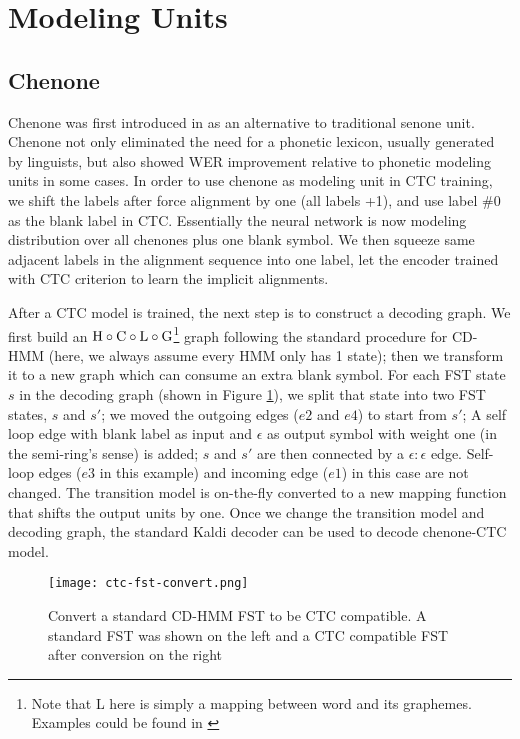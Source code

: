 \documentclass[a4paper]{article}
\begin{document}
\section{Modeling Units}

\subsection{Chenone}
\label{sec:chenone}

Chenone was first introduced in \cite{le2019senones} as an alternative to traditional senone \cite{dahl2011context} unit. Chenone not only eliminated the need for a phonetic lexicon, usually generated by linguists, but also showed WER improvement relative to phonetic modeling units in some cases. In order to use chenone as modeling unit in CTC training, we shift the labels after force alignment by one (all labels +1), and use label $\#0$ as the blank label in CTC. Essentially the neural network is now modeling distribution over all chenones plus one blank symbol. We then squeeze same adjacent labels in the alignment sequence into one label, let the encoder trained with CTC criterion to learn the implicit alignments. 

After a CTC model is trained, the next step is to construct a decoding graph. We first build an $\rm{H \circ C \circ L \circ G}$\footnote{Note that L here is simply a mapping between word and its graphemes. Examples could be found in \cite{le2019senones}}  graph following the standard procedure for CD-HMM (here, we always assume every HMM only has 1 state); then we transform it to a new graph which can consume an extra blank symbol. For each FST state $s$ in the decoding graph (shown in Figure \ref{fig:ctc_fst_convert}), we split that state into two FST states, $s$ and $s'$; we moved the outgoing edges ($e2$ and $e4$) to start from $s'$; A self loop edge with blank label as input and $\epsilon$ as output symbol with weight one (in the semi-ring's sense) is added; $s$ and $s'$ are then connected by a $\epsilon:\epsilon$ edge. Self-loop edges ($e3$ in this example) and incoming edge ($e1$) in this case are not changed. The transition model is on-the-fly converted to a new mapping function that shifts the output units by one. Once we change the transition model and decoding graph, the standard Kaldi decoder can be used to decode chenone-CTC model.

\vspace{-1em}
\begin{figure}[hhh]
    \centering
    \texttt{[image: ctc-fst-convert.png]}
    \caption{Convert a standard CD-HMM FST to be CTC compatible. A standard FST was shown on the left and a CTC compatible FST after conversion on the right}
    \label{fig:ctc_fst_convert}
\end{figure}
\vspace{-1.5em}
\end{document}
